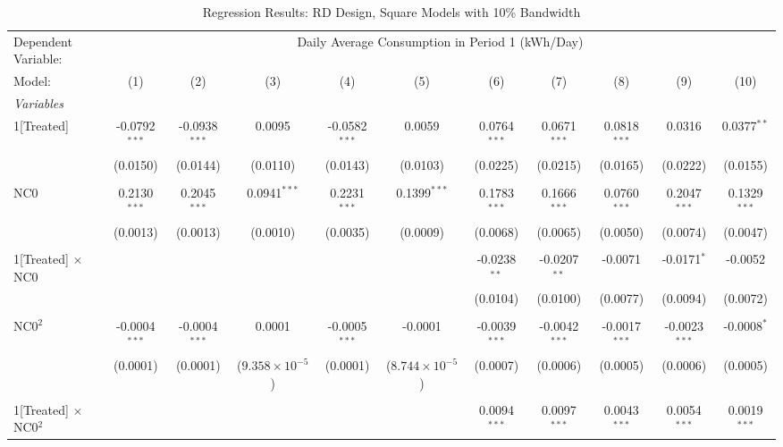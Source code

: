 \begin{table}[htbp]
\centering
\caption{\label{Table:Regression-Results_RD_Square_BW-10} Regression Results: RD Design, Square Models with 10\% Bandwidth}
\begin{adjustbox}{scale = 0.7}
\begin{tabular}{lcccccccccc}
\tabularnewline\toprule\toprule
Dependent Variable:&\multicolumn{10}{c}{Daily Average Consumption in Period 1 (kWh/Day)}\\
Model:&(1) & (2) & (3) & (4) & (5) & (6) & (7) & (8) & (9) & (10)\\
\midrule
\emph{Variables}&   &   &   &   &   &   &   &   &   &  \\
1[Treated]&-0.0792$^{***}$ & -0.0938$^{***}$ & 0.0095 & -0.0582$^{***}$ & 0.0059 & 0.0764$^{***}$ & 0.0671$^{***}$ & 0.0818$^{***}$ & 0.0316 & 0.0377$^{**}$\\
  &(0.0150) & (0.0144) & (0.0110) & (0.0143) & (0.0103) & (0.0225) & (0.0215) & (0.0165) & (0.0222) & (0.0155)\\
&   &   &   &   &   &   &   &   &   &  \\
NC0&0.2130$^{***}$ & 0.2045$^{***}$ & 0.0941$^{***}$ & 0.2231$^{***}$ & 0.1399$^{***}$ & 0.1783$^{***}$ & 0.1666$^{***}$ & 0.0760$^{***}$ & 0.2047$^{***}$ & 0.1329$^{***}$\\
  &(0.0013) & (0.0013) & (0.0010) & (0.0035) & (0.0009) & (0.0068) & (0.0065) & (0.0050) & (0.0074) & (0.0047)\\
&   &   &   &   &   &   &   &   &   &  \\
1[Treated] $\times $ NC0&   &    &    &    &    & -0.0238$^{**}$ & -0.0207$^{**}$ & -0.0071 & -0.0171$^{*}$ & -0.0052\\
  &   &    &    &    &    & (0.0104) & (0.0100) & (0.0077) & (0.0094) & (0.0072)\\
&   &   &   &   &   &   &   &   &   &  \\
NC0$^2$&-0.0004$^{***}$ & -0.0004$^{***}$ & 0.0001 & -0.0005$^{***}$ & -0.0001 & -0.0039$^{***}$ & -0.0042$^{***}$ & -0.0017$^{***}$ & -0.0023$^{***}$ & -0.0008$^{*}$\\
  &(0.0001) & (0.0001) & ($9.358\times 10^{-5}$) & (0.0001) & ($8.744\times 10^{-5}$) & (0.0007) & (0.0006) & (0.0005) & (0.0006) & (0.0005)\\
&   &   &   &   &   &   &   &   &   &  \\
1[Treated] $\times $ NC0$^2$&   &    &    &    &    & 0.0094$^{***}$ & 0.0097$^{***}$ & 0.0043$^{***}$ & 0.0054$^{***}$ & 0.0019$^{***}$\\

\end{tabular}
\end{adjustbox}
\end{table}
